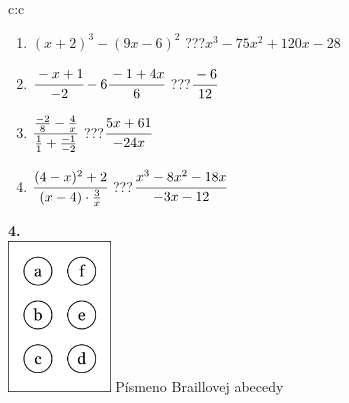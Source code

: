 \documentclass[10pt]{report}
\begin{document}
\begin{tabular}{c:c}
\begin{minipage}[c][104.5mm][t]{0.5\linewidth}
\begin{center}
\begin{minipage}{0.79\linewidth}
\begin{center}
\begin{varwidth}{\linewidth}
\begin{enumerate}
\item $(x+2)^3-(9x-6)^2$\quad \dotfill\; ???\;\dotfill \quad $x^3-75x^2+120x-28$
\item $\cfrac{-x+1}{-2}-6\cfrac{-1+4x}{6}$\quad \dotfill\; ???\;\dotfill \quad $\cfrac{-6}{12}$
\item $\cfrac{\frac{-2}{8}-\frac{4}{x}}{\frac{1}{1}+\frac{-1}{-2}}$\quad \dotfill\; ???\;\dotfill \quad $\cfrac{5x+61}{-24x}$
\item $\cfrac{(4-x)^2+2}{(x-4)\cdot\frac{3}{x}}$\quad \dotfill\; ???\;\dotfill \quad $\cfrac{x^3-8x^2-18x}{-3x-12}$
\end{enumerate}
\end{varwidth}
\end{center}
\end{minipage}
\begin{minipage}{0.20\linewidth}
\begin{center}
{\Huge\bfseries 4.} \\[2mm]
\includegraphics[height=40mm]{../images/braille.png}
{\small Písmeno Braillovej abecedy}
\end{center}
\end{minipage}
\end{center}
\end{minipage}
%
\end{tabular}
\newpage
\thispagestyle{empty}
\end{document}
